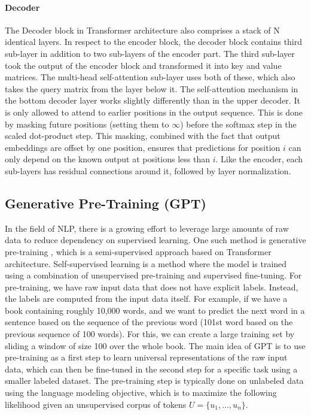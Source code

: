 \documentclass[conference]{IEEEtran}
\begin{document}
\paragraph{\textbf{Decoder}}
The Decoder block in Transformer architecture also comprises a stack of N identical layers. In respect to the encoder block, the decoder block contains third sub-layer in addition to two sub-layers of the encoder part. The third sub-layer took the output of the encoder block and transformed it into key and value matrices. The multi-head self-attention sub-layer uses both of these, which also takes the query matrix from the layer below it. The self-attention mechanism in the bottom decoder layer works slightly differently than in the upper decoder. It is only allowed to attend to earlier positions in the output sequence. This is done by masking future positions (setting them to \(\infty\)) before the softmax step in the scaled dot-product step. This masking, combined with the fact that output embeddings are offset by one position, ensures that predictions for position \(i\) can only depend on the known output at positions less than \(i\)\cite{b3}. Like the encoder, each sub-layers has residual connections around it, followed by layer normalization.

\subsection{Generative Pre-Training (GPT)}\label{AA}
In the field of NLP, there is a growing effort to leverage large amounts of raw data to reduce dependency on supervised learning. One such method is generative pre-training \cite{b10}, which is a semi-supervised approach based on Transformer architecture\cite{b3}. Self-supervised learning is a method where the model is trained using a combination of unsupervised pre-training and supervised fine-tuning. For pre-training, we have raw input data that does not have explicit labels. Instead, the labels are computed from the input data itself. For example, if we have a book containing roughly 10,000 words, and we want to predict the next word in a sentence based on the sequence of the previous word (101st word based on the previous sequence of 100 words). For this, we can create a large training set by sliding a window of size 100 over the whole book. The main idea of GPT is to use pre-training as a first step to learn universal representations of the raw input data, which can then be fine-tuned in the second step for a specific task using a smaller labeled dataset. The pre-training step is typically done on unlabeled data using the language modeling objective, which is to maximize the following likelihood given an unsupervised corpus of tokens \( U = \{u_1,...,u_n\}\)\cite{b10}.
\end{document}
